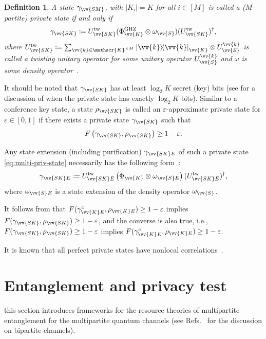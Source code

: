 \documentclass[aps,pra,twocolumn,superscriptaddress,longbibliography]{revtex4-1}
\def\GHZ{\operatorname{GHZ}}
\def\({\left(}
\def\){\right)}
\newcommand{\msc}[1]{\mathscr{#1}}
\newtheorem{definition}{Definition}
\begin{document}
\begin{definition}\label{def:multi-priv-state}
A state $\gamma_{\vv{SM}}$, with $|K_i|=K$ for all $i\in[M]$ is called a ($M$-partite) private state if and only if 
\begin{equation}\label{eq:multi-priv-state}
\gamma_{\vv{SK}}\coloneqq U^{\text{tw}}_{\vv{SK}} (\Phi^{\GHZ}_{\vv{K}}\otimes\omega_{\vv{S}}) (U^{\text{tw}}_{\vv{SK}})^\dag,
\end{equation}
where $U^{\text{tw}}_{\vv{SK}}\coloneqq \sum_{\vv{k}\in\msc{K}^{\times M}}\op{\vv{k}}_{\vv{K}}\otimes U^{\vv{k}}_{\vv{S}}$ is called a twisting unitary operator for some unitary operator $U^{\vv{k}}_{\vv{S}}$ and $\omega$ is some density operator~\cite{AH09}. 
\end{definition}
It should be noted that $\gamma_{\vv{SK}}$ has at least $\log_2K$ secret (key) bits (see \cite{HHHO09} for a discussion of when the private state has exactly $\log_2 K$ bits). Similar to a conference key state, a state $\rho_{\vv{SK}}$ is called an $\varepsilon$-approximate private state for $\varepsilon\in[0,1]$ if there exists a private state $\gamma_{\vv{SK}}$ such that~\cite{AH09} 
\begin{equation}
F\(\gamma_{\vv{SK}},\rho_{\vv{SK}}\)\geq 1-\varepsilon. 
\end{equation}

Any state extension (including purification) $\gamma_{\vv{SK}E}$ of such a private state \eqref{eq:multi-priv-state} necessarily has the following form~\cite{AH09}:
\begin{equation}
\gamma_{\vv{SK}E}\coloneqq U^{\text{tw}}_{\vv{SK}E} \(\Phi_{\vv{K}}\otimes\omega_{\vv{S}E}\) (U^{\text{tw}}_{\vv{SK}E})^\dag,
\end{equation}
where $\omega_{\vv{S}E}$ is a state extension of the density operator $\omega_{\vv{S}}$.

It follows from \cite[Theorem~IV.1]{AH09} that 
$F(\gamma^c_{\vv{K} E},\rho_{\vv{K}E})\geq 1-\varepsilon$
implies $F(\gamma_{\vv{SK}},\rho_{\vv{SK}})\geq 1-\varepsilon$, 
and the converse is also true, i.e., $F(\gamma_{\vv{SK}},\rho_{\vv{SK}})\geq 1-\varepsilon$ implies $F(\gamma^c_{\vv{K}E},\rho_{\vv{K}E})\geq 1-\varepsilon$.

It is known that all perfect private states have nonlocal correlations~\cite{ACPA10}.

\section{Entanglement and privacy test}\label{sec:MEPT}
this section introduces frameworks for the resource theories of multipartite entanglement for the multipartite quantum channels (see Refs.~\cite{D18thesis,DBW17,BDWW19,GS19} for the discussion on bipartite channels).
\end{document}
